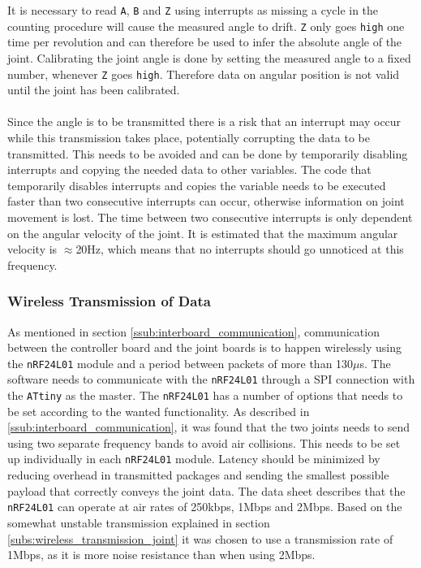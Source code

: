 It is necessary to read \texttt{A}, \texttt{B} and \texttt{Z} using interrupts as missing a cycle in the counting procedure will cause the measured angle to drift.
\texttt{Z} only goes \texttt{high} one time per revolution and can therefore be used to infer the absolute angle of the joint.
Calibrating the joint angle is done by setting the measured angle to a fixed number, whenever \texttt{Z} goes \texttt{high}.
Therefore data on angular position is not valid until the joint has been calibrated.
\\~\\
Since the angle is to be transmitted there is a risk that an interrupt may occur while this transmission takes place, potentially corrupting the data to be transmitted.
This needs to be avoided and can be done by temporarily disabling interrupts and copying the needed data to other variables.
The code that temporarily disables interrupts and copies the variable needs to be executed faster than two consecutive interrupts can occur, otherwise information on joint movement is lost.
The time between two consecutive interrupts is only dependent on the angular velocity of the joint.
It is estimated that the maximum angular velocity is  $\approx$20Hz, which means that no interrupts should go unnoticed at this frequency.

\subsubsection{Wireless Transmission of Data}
As mentioned in section \ref{ssub:interboard_communication}, communication between the controller board and the joint boards is to happen wirelessly using the \texttt{nRF24L01} module and a period between packets of more than 130$\mu$s.
The software needs to communicate with the \texttt{nRF24L01} through a SPI connection with the \texttt{ATtiny} as the master.
The \texttt{nRF24L01} has a number of options that needs to be set according to the wanted functionality.
As described in \ref{ssub:interboard_communication}, it was found that the two joints needs to send using two separate frequency bands to avoid air collisions. 
This needs to be set up individually in each \texttt{nRF24L01} module. 
Latency should be minimized by reducing overhead in transmitted packages and sending the smallest possible payload that correctly conveys the joint data.
The data sheet describes that the \texttt{nRF24L01} can operate at air rates of 250kbps, 1Mbps and 2Mbps.
Based on the somewhat unstable transmission explained in section \ref{subs:wireless_transmission_joint} it was chosen to use a transmission rate of 1Mbps, as it is more noise resistance than when using 2Mbps.

